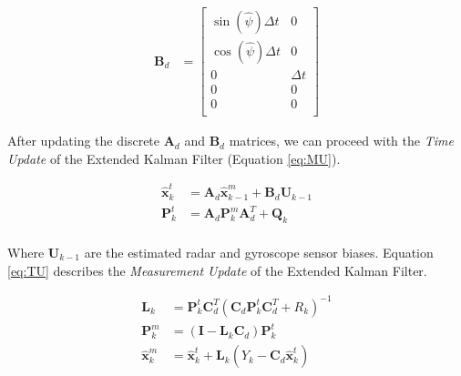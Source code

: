 \documentclass[12pt,letterpaper, onecolumn]{exam}
\begin{document}
\begin{questions}
{        \begin{equation}
            \begin{split}
                \mathbf{B}_d & =
                \begin{bmatrix}
                    \sin(\hat{\psi})\Delta t & 0        \\
                    \cos(\hat{\psi})\Delta t & 0        \\
                    0                        & \Delta t \\
                    0                        & 0        \\
                    0                        & 0        \\
                \end{bmatrix}
            \end{split}
            \label{eq:bd}
        \end{equation}

        After updating the discrete $\mathbf{A}_d$ and $\mathbf{B}_d$ matrices, we can proceed with the \textit{Time Update} of the Extended Kalman Filter (Equation \ref{eq:MU}).

        \begin{equation}
            \begin{split}
                \mathbf{\hat{x}}^t_k & = \mathbf{A}_d \mathbf{\hat{x}}^m_{k-1} + \mathbf{B}_d \mathbf{U}_{k-1}\\
                \mathbf{P}^t_k & = \mathbf{A}_d \mathbf{P}^m_k \mathbf{A}_d^T + \mathbf{Q}_k\\
            \end{split}
            \label{eq:MU}
        \end{equation}

        Where $\mathbf{U}_{k-1}$ are the estimated radar and gyroscope sensor biases. Equation \ref{eq:TU} describes the \textit{Measurement Update} of the Extended Kalman Filter.

        \begin{equation}
            \begin{split}
                \mathbf{L}_k & = \mathbf{P}^t_k \mathbf{C}^T_d \left(\mathbf{C}_d \mathbf{P}^t_k \mathbf{C}_d^T + R_k\right)^{-1}\\
                \mathbf{P}^m_k & = \left(\mathbf{I} - \mathbf{L}_k \mathbf{C}_d\right)\mathbf{P}^t_k \\
                \mathbf{\hat{x}}^m_k & = \mathbf{\hat{x}}^t_k + \mathbf{L}_k \left(Y_k - \mathbf{C}_d \mathbf{\hat{x}}^t_k\right) \\
            \end{split}
            \label{eq:TU}
        \end{equation}


}
\end{questions}
\end{document}
